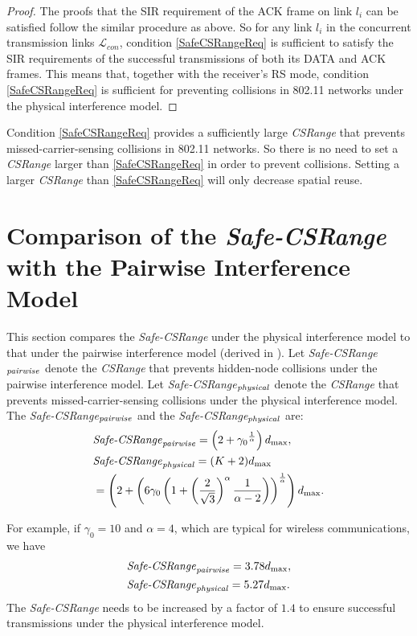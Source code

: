 \documentclass[conference]{IEEEtran}
\begin{document}
\begin{proof}
The proofs that the SIR requirement of the ACK frame on link $l_i$
can be satisf\/ied follow the similar procedure as above. So for any
link $l_i$ in the concurrent transmission links $\mathcal{L}_{con}$,
condition \eqref{SafeCSRangeReq} is suff\/icient to satisfy the SIR
requirements of the successful transmissions of both its DATA and
ACK frames. This means that, together with the receiver's RS mode,
condition \eqref {SafeCSRangeReq} is suff\/icient for preventing
collisions in 802.11 networks under the physical interference model.
\end{proof}

Condition \eqref{SafeCSRangeReq} provides a suff\/iciently large
\emph{CSRange} that prevents missed-carrier-sensing collisions in
802.11 networks. So there is no need to set a \emph{CSRange} larger
than \eqref{SafeCSRangeReq} in order to prevent collisions. Setting
a larger \emph{CSRange} than \eqref{SafeCSRangeReq} will only
decrease spatial reuse.

\section{Comparison of the \emph{Safe-CSRange} with the Pairwise Interference
Model}

This section compares the \emph{Safe-CSRange} under the physical
interference model to that under the pairwise interference model
(derived in \cite{LiBin}). Let
\emph{Safe-CSRange}$_\text{\emph{pairwise}}$ denote the
\emph{CSRange} that prevents hidden-node collisions under the
pairwise interference model. Let
\emph{Safe-CSRange}$_\text{\emph{physical}}$ denote the
\emph{CSRange} that prevents missed-carrier-sensing collisions under
the physical interference model. The
\emph{Safe-CSRange}$_\text{\emph{pairwise}}$ and the
\emph{Safe-CSRange}$_\text{\emph{physical}}$ are:
\begin{align}
&\text{\emph{Safe-CSRange}}_\text{\emph{pairwise}}=\left(2+
{\gamma_0}^{\frac{1}{\alpha }}\right)d_{\max}
\label{SafeCSRangePro},\\
&\text{\emph{Safe-CSRange}}_\text{\emph{physical}}=(K+2)d_{\max}\nonumber\\
&=\left(2+ \left( {6\gamma_0 \left( {1 + \left( {\frac{2}{\sqrt 3 }}
\right)^\alpha \frac{1}{\alpha - 2}} \right)}
\right)^{\frac{1}{\alpha }}\right)d_{\max} \label{SafeCSRangePhy}.
\end{align}

For example, if $\gamma_0=10$ and $\alpha=4$, which are typical for
wireless communications, we have
\begin{align}
&\text{\emph{Safe-CSRange}}_\text{\emph{pairwise}}=3.78d_{\max}
\label{SafeCSRangePro104},\\
&\text{\emph{Safe-CSRange}}_\text{\emph{physical}}=5.27d_{\max}
\label{SafeCSRangePhy104}.
\end{align}
The \emph{Safe-CSRange} needs to be increased by a factor of $1.4$
to ensure successful transmissions under the physical interference
model.
\end{document}

